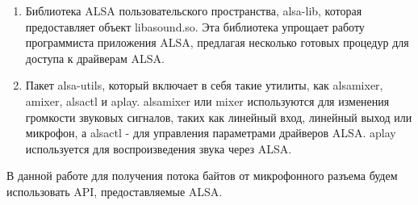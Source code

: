 \begin{enumerate}
\item Библиотека ALSA пользовательского пространства, alsa-lib, которая предоставляет объект libasound.so. Эта библиотека упрощает работу программиста приложения ALSA, предлагая несколько готовых процедур для доступа к драйверам ALSA.

\item Пакет alsa-utils, который включает в себя такие утилиты, как alsamixer, amixer, alsactl и aplay. alsamixer или mixer используются для изменения громкости звуковых сигналов, таких как линейный вход, линейный выход или микрофон, а alsactl - для управления параметрами драйверов ALSA. aplay используется для воспроизведения звука через ALSA.
\end{enumerate}

В данной работе для получения потока байтов от микрофонного разъема будем использовать API, предоставляемые ALSA.
